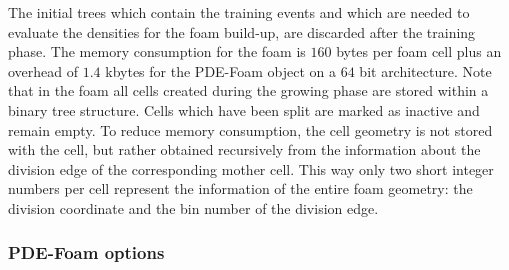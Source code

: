 The initial trees which contain the training events and which are needed to
evaluate the densities for the foam build-up, are discarded after the
training phase.  The memory consumption for the foam is $160$ bytes
per foam cell plus an overhead of $1.4$ kbytes for the PDE-Foam object
on a $64$ bit architecture.  Note that in the foam all cells created
during the growing phase are stored within a binary tree
structure. Cells which have been split are marked as inactive and
remain empty. To reduce memory consumption, the cell geometry is
not stored with the cell, but rather obtained recursively from the
information about the division edge of the corresponding mother
cell. This way only two short integer numbers per cell represent the
information of the entire foam geometry: the division coordinate
and the bin number of the division edge.

\subsubsection*{PDE-Foam options}

